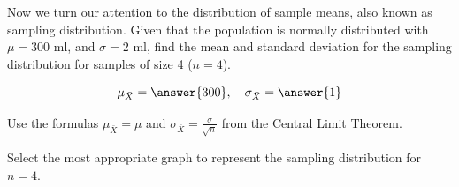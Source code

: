 \documentclass{ximera}
\begin{document}
\begin{question}\label{quest:samplingDist}
    Now we turn our attention to the distribution of sample means, also known as sampling distribution.  Given that the population is normally distributed with $\mu=300$ ml, and $\sigma=2$ ml, find the mean and standard deviation for the sampling distribution for samples of size 4 ($n=4$).

    $$\mu_{\bar{X}}=\answer{300},\quad \sigma_{\bar{X}}=\answer{1}$$

\begin{hint}
    Use the formulas $\mu_{\bar{X}}=\mu$ and $\sigma_{\bar{X}}=\frac{\sigma}{\sqrt{n}}$ from the Central Limit Theorem.
\end{hint}    

Select the most appropriate graph to represent the sampling distribution for $n=4$.


\end{question}
\end{document}
